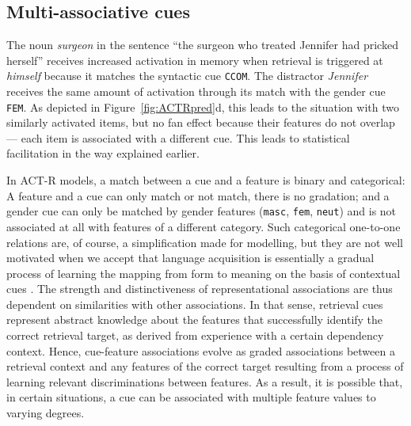 \documentclass{cambridge7A}\usepackage[]{graphicx}\usepackage[]{color}
\newcommand{\actrcue}[1]{\texttt{\uppercase{#1}}}
\begin{document}
\subsection{Multi-associative cues}
\label{sec:cueconf}
The noun \textit{surgeon} in the sentence ``the surgeon who treated Jennifer had pricked herself'' receives increased activation in memory when retrieval is triggered at \textit{himself} because it matches the syntactic cue \actrcue{CCOM}.
The distractor \textit{Jennifer} receives the same amount of activation through its match with the gender cue \actrcue{FEM}. As depicted in Figure~\ref{fig:ACTRpred}d, this leads to the situation with two similarly activated items, but no fan effect because their features do not overlap --- each item is associated with a different cue.
This leads to statistical facilitation in the way explained earlier.

In ACT-R models, a match between a cue and a feature is  binary and  categorical: A feature and a cue can only match or not match, there is no gradation; and a gender cue can only be matched by gender features (\texttt{masc}, \texttt{fem}, \texttt{neut}) and is not associated at all with features of a different category.
Such categorical one-to-one relations are, of course, a simplification made for modelling, but they are not well motivated when we accept that language acquisition is essentially a gradual process of learning the mapping from form to meaning on the basis of contextual cues \citep[see, e.g.,][]{bybee2006usage,langacker1987foundations,tomasello2003constructing}. The strength and distinctiveness of representational associations are thus dependent on similarities with other associations.
In that sense, retrieval cues represent abstract knowledge about the features that successfully identify the correct retrieval target, as derived from experience with a certain dependency context. Hence, cue-feature associations evolve as graded associations between a retrieval context and any features of the correct target resulting from a process of learning relevant discriminations between features. 
As a result, it is possible that, in certain situations, a cue can be associated with multiple feature values to varying degrees. 
\end{document}
